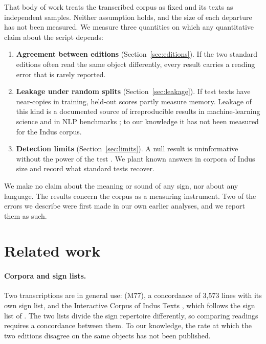 \documentclass[11pt,a4paper]{article}
\begin{document}
That body of work treats the transcribed corpus as fixed and its texts as independent samples. Neither assumption holds, and the size of each departure has not been measured. We measure three quantities on which any quantitative claim about the script depends:

\begin{enumerate}
  \item \textbf{Agreement between editions} (Section~\ref{sec:editions}). If the two standard editions often read the same object differently, every result carries a reading error that is rarely reported.
  \item \textbf{Leakage under random splits} (Section~\ref{sec:leakage}). If test texts have near-copies in training, held-out scores partly measure memory. Leakage of this kind is a documented source of irreproducible results in machine-learning science \citep{kapoor2023} and in NLP benchmarks \citep{lewis2021,sogaard2021,lee2022}; to our knowledge it has not been measured for the Indus corpus.
  \item \textbf{Detection limits} (Section~\ref{sec:limits}). A null result is uninformative without the power of the test \citep{button2013}. We plant known answers in corpora of Indus size and record what standard tests recover.
\end{enumerate}

We make no claim about the meaning or sound of any sign, nor about any language. The results concern the corpus as a measuring instrument. Two of the errors we describe were first made in our own earlier analyses, and we report them as such.

\section{Related work}

\paragraph{Corpora and sign lists.} Two transcriptions are in general use: \citet{mahadevan1977} (M77), a concordance of 3,573 lines with its own sign list, and the Interactive Corpus of Indus Texts \citep[ICIT;][]{icit}, which follows the sign list of \citet{wells2015}. The two lists divide the sign repertoire differently, so comparing readings requires a concordance between them. To our knowledge, the rate at which the two editions disagree on the same objects has not been published.
\end{document}
